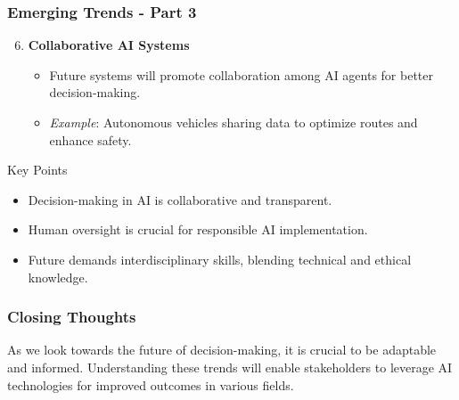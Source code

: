 \documentclass[aspectratio=169]{beamer}
\begin{document}
\begin{frame}[fragile]
    \frametitle{Emerging Trends - Part 3}
    \begin{enumerate}
        \setcounter{enumi}{5} %
        \item \textbf{Collaborative AI Systems}
            \begin{itemize}
                \item Future systems will promote collaboration among AI agents for better decision-making.
                \item \textit{Example}: Autonomous vehicles sharing data to optimize routes and enhance safety.
            \end{itemize}
    \end{enumerate}
    
    \begin{block}{Key Points}
        \begin{itemize}
            \item Decision-making in AI is collaborative and transparent.
            \item Human oversight is crucial for responsible AI implementation.
            \item Future demands interdisciplinary skills, blending technical and ethical knowledge.
        \end{itemize}
    \end{block}
\end{frame}

\begin{frame}[fragile]
    \frametitle{Closing Thoughts}
    As we look towards the future of decision-making, it is crucial to be adaptable and informed. Understanding these trends will enable stakeholders to leverage AI technologies for improved outcomes in various fields.
\end{frame}
\end{document}
